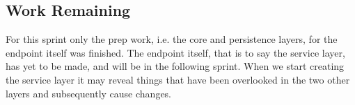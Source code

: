 \subsection{Work Remaining}
For this sprint only the prep work, i.e. the core and persistence layers, for the endpoint itself was finished.
The endpoint itself, that is to say the service layer, has yet to be made, and will be in the following sprint.
When we start creating the service layer it may reveal things that have been overlooked in the two other layers and subsequently cause changes.
